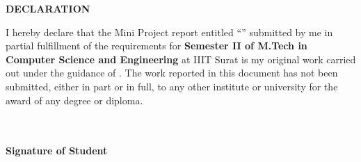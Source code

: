 \thispagestyle{plain}
\normalsize

\begin{center}
{\Large {\bf \uppercase{Declaration}}}
\end{center}

\vspace{\baselineskip}
\justify
\noindent I hereby declare that the Mini Project report entitled ``\textbf{\mytitle}'' submitted by me in partial fulfillment of the requirements for \textbf{Semester II of M.Tech in Computer Science and Engineering} at IIIT Surat is my original work carried out under the guidance of \mysupervisor. The work reported in this document has not been submitted, either in part or in full, to any other institute or university for the award of any degree or diploma.



\justify

\begin{minipage}{\textwidth}
\begin{flushright}

{\small \bf \textcolor{white}{}}\\
{\small \bf \textcolor{white}{}}\\
{\small \bf Signature of Student} \\{\small \bf \myrollno}\\[0.65cm]
\end{flushright}
\end{minipage}
\newpage
